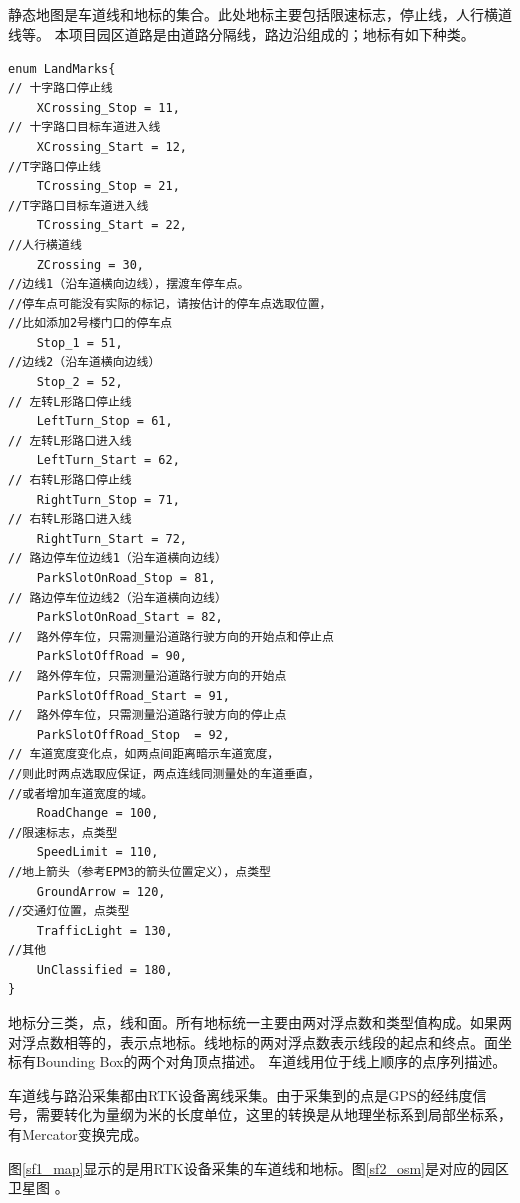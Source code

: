 \documentclass[12pt,a4paper]{article}
\newcommand{\zhiv}{\fontsize{12pt}{18pt}\selectfont}      %
\begin{document}
\subsection{\textbf{\song{\zhiv 静态地图采集和存储}}}
静态地图是车道线和地标的集合。此处地标主要包括限速标志，停止线，人行横道线等。
本项目园区道路是由道路分隔线，路边沿组成的；地标有如下种类。
\begin{verbatim}
enum LandMarks{
// 十字路口停止线
    XCrossing_Stop = 11,
// 十字路口目标车道进入线
    XCrossing_Start = 12,
//T字路口停止线
    TCrossing_Stop = 21,
//T字路口目标车道进入线
    TCrossing_Start = 22,
//人行横道线
    ZCrossing = 30,
//边线1（沿车道横向边线），摆渡车停车点。
//停车点可能没有实际的标记，请按估计的停车点选取位置，
//比如添加2号楼门口的停车点
    Stop_1 = 51,
//边线2（沿车道横向边线）
    Stop_2 = 52,
// 左转L形路口停止线
    LeftTurn_Stop = 61,
// 左转L形路口进入线
    LeftTurn_Start = 62,
// 右转L形路口停止线
    RightTurn_Stop = 71,
// 右转L形路口进入线
    RightTurn_Start = 72,
// 路边停车位边线1（沿车道横向边线）
    ParkSlotOnRoad_Stop = 81,
// 路边停车位边线2（沿车道横向边线）
    ParkSlotOnRoad_Start = 82,
//  路外停车位，只需测量沿道路行驶方向的开始点和停止点
    ParkSlotOffRoad = 90,
//  路外停车位，只需测量沿道路行驶方向的开始点
    ParkSlotOffRoad_Start = 91,
//  路外停车位，只需测量沿道路行驶方向的停止点
    ParkSlotOffRoad_Stop  = 92,
// 车道宽度变化点，如两点间距离暗示车道宽度，
//则此时两点选取应保证，两点连线同测量处的车道垂直，
//或者增加车道宽度的域。
    RoadChange = 100,
//限速标志，点类型
    SpeedLimit = 110,
//地上箭头（参考EPM3的箭头位置定义），点类型
    GroundArrow = 120,
//交通灯位置，点类型
    TrafficLight = 130,
//其他
    UnClassified = 180,
}
\end{verbatim}
地标分三类，点，线和面。所有地标统一主要由两对浮点数和类型值构成。如果两对浮点数相等的，表示点地标。线地标的两对浮点数表示线段的起点和终点。面坐标有Bounding Box的两个对角顶点描述。 车道线用位于线上顺序的点序列描述。

车道线与路沿采集都由RTK设备离线采集。由于采集到的点是GPS的经纬度信号，需要转化为量纲为米的长度单位，这里的转换是从地理坐标系到局部坐标系，有Mercator变换完成。

图\ref{sf1_map}显示的是用RTK设备采集的车道线和地标。图\ref{sf2_osm}是对应的园区卫星图\parencite{OpenStreetMap} 。
\end{document}

